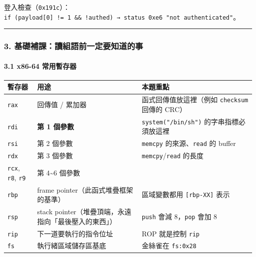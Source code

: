 \documentclass[10pt,a4paper]{article}
\newcounter{none}
\begin{document}
登入檢查（\texttt{0x191c}）：\texttt{if\ \allowbreak{}(payload{[}0{]}\ \allowbreak{}!=\ \allowbreak{}1\ \allowbreak{}\&\allowbreak{}\&\allowbreak{}\ \allowbreak{}!authed)\ \allowbreak{}→\ \allowbreak{}status\ \allowbreak{}0xe6\ \allowbreak{}"not\ \allowbreak{}authenticated"}。

\begin{center}\rule{0.5\linewidth}{0.5pt}\end{center}

\subsubsection{3.
基礎補課：讀組語前一定要知道的事}\label{ux57faux790eux88dcux8ab2ux8b80ux7d44ux8a9eux524dux4e00ux5b9aux8981ux77e5ux9053ux7684ux4e8b}

\paragraph{3.1 x86-64
常用暫存器}\label{x86-64-ux5e38ux7528ux66abux5b58ux5668}

{\def\LTcaptype{none} %
\begin{longtable}[]{@{}
  >{\raggedright\arraybackslash}p{}
  >{\raggedright\arraybackslash}p{}
  >{\raggedright\arraybackslash}p{}@{}}
\toprule\noalign{}
\begin{minipage}[b]{\linewidth}\raggedright
暫存器
\end{minipage} & \begin{minipage}[b]{\linewidth}\raggedright
用途
\end{minipage} & \begin{minipage}[b]{\linewidth}\raggedright
本題重點
\end{minipage} \\
\midrule\noalign{}
\endhead
\bottomrule\noalign{}
\endlastfoot
\texttt{rax} & 回傳值 / 累加器 & 函式回傳值放這裡（例如
\texttt{checksum} 回傳的 CRC） \\
\texttt{rdi} & \textbf{第 1 個參數} & \texttt{system("/\allowbreak{}bin/\allowbreak{}sh")}
的字串指標必須放這裡 \\
\texttt{rsi} & 第 2 個參數 & \texttt{memcpy} 的來源、\texttt{read} 的
buffer \\
\texttt{rdx} & 第 3 個參數 & \texttt{memcpy}/\texttt{read} 的長度 \\
\texttt{rcx}, \texttt{r8}, \texttt{r9} & 第 4\textasciitilde6 個參數
& \\
\texttt{rbp} & frame pointer（此函式堆疊框架的基準） & 區域變數都用
\texttt{{[}rbp-\allowbreak{}XX{]}} 表示 \\
\texttt{rsp} & stack pointer（堆疊頂端，永遠指向「最後壓入的東西」） &
\texttt{push} 會減 8，\texttt{pop} 會加 8 \\
\texttt{rip} & 下一道要執行的指令位址 & ROP 就是控制 \texttt{rip} \\
\texttt{fs} & 執行緒區域儲存區基底 & 金絲雀在 \texttt{fs:\allowbreak{}0x28} \\
\end{longtable}
}
\end{document}
